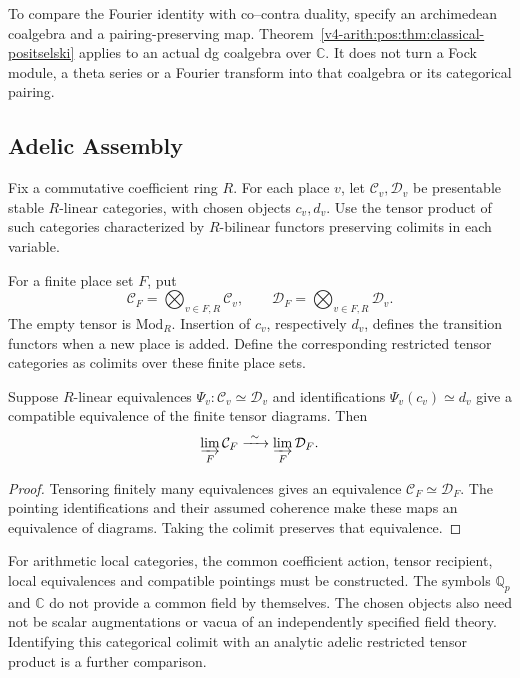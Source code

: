 To compare the Fourier identity with co--contra duality,
specify an archimedean coalgebra and a pairing-preserving map.
Theorem~\ref{v4-arith:pos:thm:classical-positselski}
applies to an actual dg coalgebra over \(\mathbb C\).
It does not turn a Fock module, a theta series or a Fourier
transform into that coalgebra or its categorical pairing.

\subsection{Adelic Assembly}
\label{v4-arith:pos:adelic-assembly}

Fix a commutative coefficient ring \(R\).
For each place \(v\), let \(\mathcal C_v,\mathcal D_v\)
be presentable stable \(R\)-linear categories, with chosen
objects \(c_v,d_v\). Use the tensor product of such categories
characterized by \(R\)-bilinear functors preserving colimits
in each variable.

For a finite place set \(F\), put
\[
 \mathcal C_F=\bigotimes_{v\in F,R}\mathcal C_v,
 \qquad
 \mathcal D_F=\bigotimes_{v\in F,R}\mathcal D_v.
\]
The empty tensor is \(\mathrm{Mod}_R\).
Insertion of \(c_v\), respectively \(d_v\), defines the
transition functors when a new place is added.
Define the corresponding restricted tensor categories as
colimits over these finite place sets.

\begin{theorem}
\label{v4-arith:pos:thm:adelic-positselski}
Suppose \(R\)-linear equivalences
\(\Psi_v:\mathcal C_v\simeq\mathcal D_v\) and identifications
\(\Psi_v(c_v)\simeq d_v\) give a compatible equivalence of
the finite tensor diagrams. Then
\begin{equation}
\label{v4-arith:pos:eq:adelic-positselski}
 \varinjlim_F\mathcal C_F
 \xrightarrow{\ \sim\ }
 \varinjlim_F\mathcal D_F.
\end{equation}
\end{theorem}
\begin{proof}
Tensoring finitely many equivalences gives an equivalence
\(\mathcal C_F\simeq\mathcal D_F\).
The pointing identifications and their assumed coherence make
these maps an equivalence of diagrams. Taking the colimit
preserves that equivalence.
\end{proof}

For arithmetic local categories, the common coefficient action,
tensor recipient, local equivalences and compatible pointings
must be constructed. The symbols \(\mathbb Q_p\) and
\(\mathbb C\) do not provide a common field by themselves.
The chosen objects also need not be scalar augmentations or
vacua of an independently specified field theory.
Identifying this categorical colimit with an analytic adelic
restricted tensor product is a further comparison.

